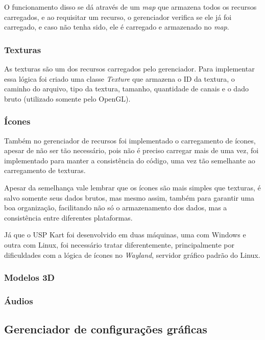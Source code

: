 O funcionamento disso se dá através de um \textit{map} que armazena todos os recursos carregados, e ao requisitar um recurso, o gerenciador verifica se ele já foi carregado, e caso não tenha sido, ele é carregado e armazenado no \textit{map}.

\subsubsection{Texturas}

As texturas são um dos recursos carregados pelo gerenciador. Para implementar essa lógica foi criado uma classe \textit{Texture} que armazena o ID da textura, o caminho do arquivo, tipo da textura, tamanho, quantidade de canais e o dado bruto (utilizado somente pelo OpenGL).

\subsubsection{Ícones}

Também no gerenciador de recursos foi implementado o carregamento de ícones, apesar de não ser tão necessário, pois não é preciso carregar mais de uma vez, foi implementado para manter a consistência do código, uma vez tão semelhante ao carregamento de texturas.

Apesar da semelhança vale lembrar que os ícones são mais simples que texturas, é salvo somente seus dados brutos, mas mesmo assim, também para garantir uma boa organização, facilitando não só o armazenamento dos dados, mas a consistência entre diferentes plataformas. 

Já que o USP Kart foi desenvolvido em duas máquinas, uma com Windows e outra com Linux, foi necessário tratar diferentemente, principalmente por dificuldades com a lógica de ícones no \textit{Wayland}, servidor gráfico padrão do Linux.

\subsubsection{Modelos 3D}
\subsubsection{Áudios}

\subsection{Gerenciador de configurações gráficas}

